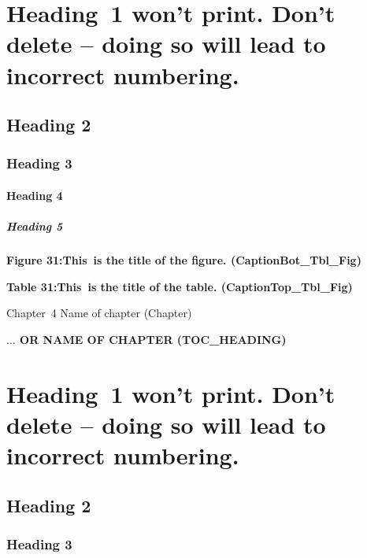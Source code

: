 \documentclass[12pt]{report}
\begin{document}
\section*{Heading\ 1 won’t print.  Don’t delete – doing so will lead to incorrect numbering.}
\subsection*{Heading 2}
\subsubsection*{Heading 3}
\paragraph*{Heading 4}
\subparagraph*{Heading 5}
\begin{FlushLeft}
\textbf{Figure 31:\tab This\ is the title of the figure.  (CaptionBot\_Tbl\_Fig)}
\end{FlushLeft}\par

\begin{FlushLeft}
\textbf{Table 31:\tab This\ is the title of the table.  (CaptionTop\_Tbl\_Fig)}
\end{FlushLeft}\par




\newpage

\vspace{\baselineskip}Chapter\ 4  Name of chapter (Chapter)\par

\begin{FlushLeft}
{\fontsize{14pt}{16.8pt}\selectfont \textbf{\uppercase{$ \ldots $ or Name of Chapter (TOC\_HEADING)}}\par}
\end{FlushLeft}\par

\section*{Heading\ 1 won’t print.  Don’t delete – doing so will lead to incorrect numbering.}
\subsection*{Heading 2}
\subsubsection*{Heading 3}
\end{document}

